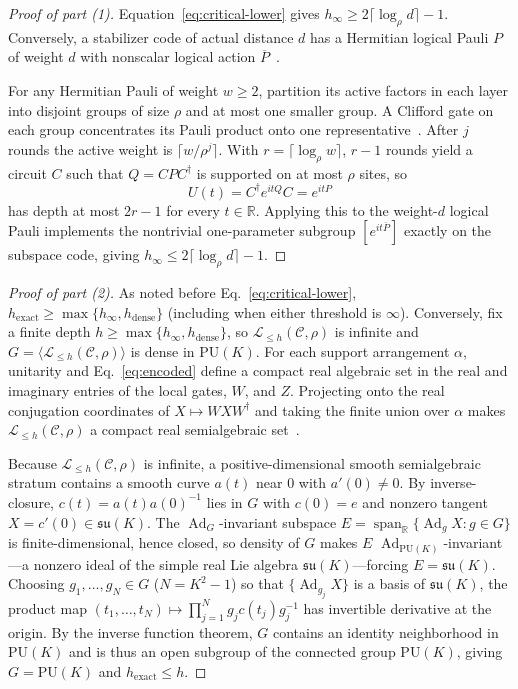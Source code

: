 \documentclass[aps,prl,reprint,notitlepage,nofootinbib,nobibnotes]{revtex4-2}
\newcommand{\PU}{\mathrm{PU}}
\begin{document}
\begin{proof}[Proof of part (1)]
Equation~\eqref{eq:critical-lower} gives $h_\infty\ge2\lceil\log_\rho d\rceil-1$. Conversely, a
stabilizer code of actual distance $d$ has a Hermitian logical Pauli $P$ of weight $d$ with
nonscalar logical action $\overline P$~\cite[Sec.~3.2]{GottesmanStabilizer}.

For any Hermitian Pauli of weight $w\ge2$, partition its active factors in each layer into disjoint
groups of size $\rho$ and at most one smaller group. A Clifford gate on each group concentrates its
Pauli product onto one representative~\cite{BonetMonroig,Cowtan,HaahLiuTan}. After $j$ rounds the
active weight is $\lceil w/\rho^j\rceil$. With $r=\lceil\log_\rho w\rceil$, $r-1$ rounds yield a
circuit $C$ such that $Q=CPC^\dagger$ is supported on at most $\rho$ sites, so
\begin{equation}\label{eq:pauli-family}
 U(t)=C^\dagger e^{itQ}C=e^{itP}
\end{equation}
has depth at most $2r-1$ for every $t\in\mathbb R$. Applying this to the weight-$d$ logical Pauli
implements the nontrivial one-parameter subgroup $[e^{it\overline P}]$ exactly on the subspace
code, giving $h_\infty\le 2\lceil\log_\rho d\rceil-1$.
\end{proof}

\begin{proof}[Proof of part (2)]
As noted before Eq.~\eqref{eq:critical-lower},
$h_{\mathrm{exact}}\ge\max\{h_\infty,h_{\mathrm{dense}}\}$ (including when either threshold is
$\infty$). Conversely, fix a finite depth $h\ge\max\{h_\infty,h_{\mathrm{dense}}\}$, so $\mathcal
L_{\le h}(\mathcal C,\rho)$ is infinite and $G=\langle\mathcal L_{\le h}(\mathcal C,\rho)\rangle$
is dense in $\PU(K)$. For each support arrangement $\alpha$, unitarity and Eq.~\eqref{eq:encoded}
define a compact real algebraic set in the real and imaginary entries of the local gates, $W$, and
$Z$. Projecting onto the real conjugation coordinates of $X\mapsto WXW^\dagger$ and taking the
finite union over $\alpha$ makes $\mathcal L_{\le h}(\mathcal C,\rho)$ a compact real semialgebraic
set~\cite{BasuPollackRoy}.

Because $\mathcal L_{\le h}(\mathcal C,\rho)$ is infinite, a positive-dimensional smooth
semialgebraic stratum contains a smooth curve $a(t)$ near $0$ with $a'(0)\ne0$. By inverse-closure,
$c(t)=a(t)a(0)^{-1}$ lies in $G$ with $c(0)=e$ and nonzero tangent $X=c'(0)\in\mathfrak{su}(K)$.
The $\operatorname{Ad}_G$-invariant subspace $E=\operatorname{span}_{\mathbb
R}\{\operatorname{Ad}_g X:g\in G\}$ is finite-dimensional, hence closed, so density of $G$ makes
$E$ $\operatorname{Ad}_{\PU(K)}$-invariant---a nonzero ideal of the simple real Lie algebra
$\mathfrak{su}(K)$---forcing $E=\mathfrak{su}(K)$. Choosing $g_1,\ldots,g_N\in G$ ($N=K^2-1$) so
that $\{\operatorname{Ad}_{g_j}X\}$ is a basis of $\mathfrak{su}(K)$, the product map
$(t_1,\ldots,t_N)\mapsto\prod_{j=1}^N g_jc(t_j)g_j^{-1}$ has invertible derivative at the origin.
By the inverse function theorem, $G$ contains an identity neighborhood in $\PU(K)$ and is thus an
open subgroup of the connected group $\PU(K)$, giving $G=\PU(K)$ and $h_{\mathrm{exact}}\le h$.
\end{proof}
\end{document}
